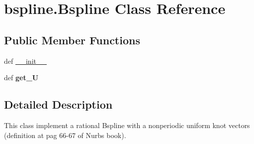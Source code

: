 \hypertarget{classbspline_1_1Bspline}{\section{bspline.\-Bspline \-Class \-Reference}
\label{classbspline_1_1Bspline}
}
\subsection*{\-Public \-Member \-Functions}
\begin{DoxyCompactItemize}
\item 
def \hyperlink{classbspline_1_1Bspline_a6ff60f8423946ec65f8e74ea4790c177}{\-\_\-\-\_\-init\-\_\-\-\_\-}
\item 
\hypertarget{classbspline_1_1Bspline_a791969b1414f2f8e1c03de6af94ad2a3}{def {\bfseries get\-\_\-\-U}}\label{classbspline_1_1Bspline_a791969b1414f2f8e1c03de6af94ad2a3}

\end{DoxyCompactItemize}


\subsection{\-Detailed \-Description}
\begin{DoxyVerb}
This class implement a rational Bspline with a nonperiodic uniform
knot vectors (definition at pag 66-67 of Nurbs book). 
\end{DoxyVerb}
 

